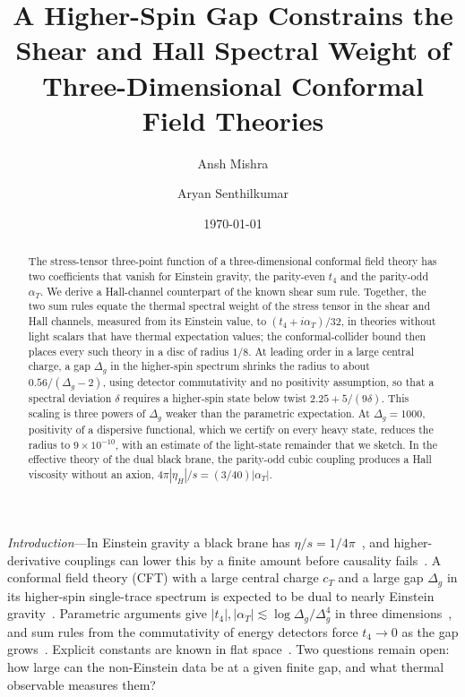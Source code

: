 \documentclass[aps,prl,twocolumn,superscriptaddress,nofootinbib,floatfix]{revtex4-2}
\begin{document}
\title{A Higher-Spin Gap Constrains the Shear and Hall Spectral Weight of Three-Dimensional Conformal Field Theories}

\author{Ansh Mishra}
\author{Aryan Senthilkumar}

\date{\today}

\begin{abstract}
The stress-tensor three-point function of a three-dimensional conformal field theory has two coefficients that vanish for
Einstein gravity, the parity-even $t_4$ and the parity-odd $\alpha_T$. We derive a Hall-channel counterpart of the known shear
sum rule. Together, the two sum rules equate the thermal spectral weight of the stress tensor in the shear and Hall channels,
measured from its Einstein value, to $(t_4+i\alpha_T)/32$, in theories without light scalars that have thermal expectation
values; the conformal-collider bound then places every such theory in a disc of radius $1/8$. At leading order in a large
central charge, a gap $\Delta_g$ in the higher-spin spectrum shrinks the radius to about $0.56/(\Delta_g-2)$, using detector
commutativity and no positivity assumption, so that a spectral deviation $\delta$ requires a higher-spin state below twist
$2.25+5/(9\delta)$. This scaling is three powers of $\Delta_g$ weaker than the parametric expectation. At $\Delta_g=1000$,
positivity of a dispersive functional, which we certify on every heavy state, reduces the radius to $9\times10^{-10}$, with an
estimate of the light-state remainder that we sketch. In the effective theory of the dual black brane, the parity-odd cubic
coupling produces a Hall viscosity without an axion, $4\pi|\eta_H|/s=(3/40)|\alpha_T|$.
\end{abstract}

\maketitle

\textit{Introduction}---In Einstein gravity a black brane has $\eta/s=1/4\pi$~\cite{Kovtun:2004de}, and higher-derivative
couplings can lower this by a finite amount before causality fails~\cite{Brigante:2007nu,Brigante:2008gz}. A conformal field
theory (CFT) with a large central charge $c_T$ and a large gap $\Delta_g$ in its higher-spin single-trace spectrum is expected
to be dual to nearly Einstein gravity~\cite{HPPS,CEMZ,AHKT}. Parametric arguments give $|t_4|,|\alpha_T|\lesssim\log\Delta_g/\Delta_g^4$
in three dimensions~\cite{AKT,MeltzerPerlmutter,CEMZ}, and sum rules from the commutativity of energy detectors force $t_4\to0$
as the gap grows~\cite{KKSDZ,BHM}. Explicit constants are known in flat space~\cite{CHLPS}. Two questions remain open: how
large can the non-Einstein data be at a given finite gap, and what thermal observable measures them?
\end{document}
